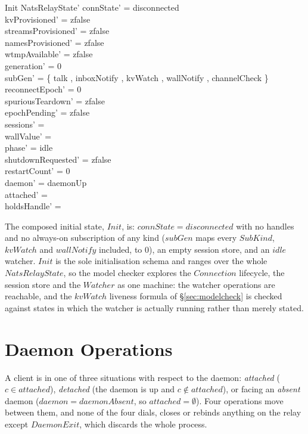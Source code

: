 \documentclass[a4paper,10pt,fleqn]{article}
\begin{document}
\begin{schema}{Init}
  NatsRelayState'
  \where
  connState' = disconnected \\
  kvProvisioned' = zfalse \\
  streamsProvisioned' = zfalse \\
  namesProvisioned' = zfalse \\
  wtmpAvailable' = zfalse \\
  generation' = 0 \\
  subGen' = \{ talk , inboxNotify , kvWatch , wallNotify , channelCheck  \} \\
  reconnectEpoch' = 0 \\
  spuriousTeardown' = zfalse \\
  epochPending' = zfalse \\
  sessions' = \emptyset \\
  wallValue' = \emptyset \\
  phase' = idle \\
  shutdownRequested' = zfalse \\
  restartCount' = 0 \\
  daemon' = daemonUp \\
  attached' = \emptyset \\
  holdsHandle' = \emptyset
\end{schema}

The composed initial state, $Init$, is: $connState = disconnected$ with no
handles and no always-on subscription of any kind ($subGen$ maps every
$SubKind$, $kvWatch$ and $wallNotify$ included, to $0$), an empty session store, and an
$idle$ watcher.  $Init$ is the sole initialisation schema and ranges over
the whole $NatsRelayState$, so the model checker explores the $Connection$
lifecycle, the session store and the $Watcher$ as one machine: the watcher
operations are reachable, and the $kvWatch$ liveness formula of
\S\ref{sec:modelcheck} is checked against states in which the watcher is
actually running rather than merely stated.

\section{Daemon Operations}
\label{sec:daemonops}

A client is in one of three situations with respect to the daemon:
\emph{attached} ($c \in attached$), \emph{detached} (the daemon is up and
$c \notin attached$), or facing an \emph{absent} daemon
($daemon = daemonAbsent$, so $attached = \emptyset$).  Four operations
move between them, and none of the four dials, closes or rebinds anything
on the relay except $DaemonExit$, which discards the whole process.
\end{document}
